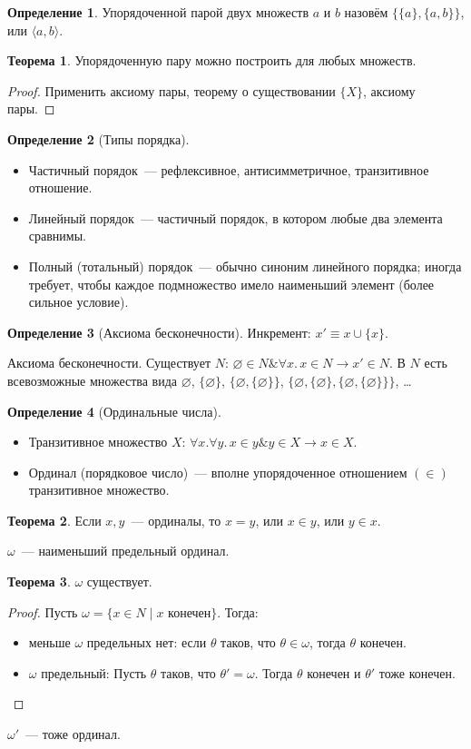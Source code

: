 \documentclass[a4paper,11pt]{article}
\theoremstyle{definition}
\newtheorem*{thm}{Теорема}
\newtheorem*{dfn}{Определение}
\newcommand{\amp}{\mathbin{\&}}
\begin{document}
\begin{dfn}
Упорядоченной парой двух множеств $a$ и $b$ назовём $\{\{a\}, \{a, b\}\}$, или
$\langle a, b\rangle$.
\end{dfn}
\begin{thm}
Упорядоченную пару можно построить для любых множеств.
\end{thm}
\begin{proof}
Применить аксиому пары, теорему о существовании $\{X\}$, аксиому пары.
\end{proof}
\begin{dfn}[Типы порядка]
\begin{itemize}
\item Частичный порядок~--- рефлексивное, антисимметричное, транзитивное
  отношение.
\item Линейный порядок~--- частичный порядок, в котором любые два элемента
  сравнимы.
\item Полный (тотальный) порядок~--- обычно синоним линейного порядка; иногда
  требует, чтобы каждое подмножество имело наименьший элемент (более сильное
  условие).
\end{itemize}
\end{dfn}
\begin{dfn}[Аксиома бесконечности]
Инкремент: $x' \equiv x \cup \{x\}$.

Аксиома бесконечности. Существует $N$: $\varnothing \in N \amp \forall x.\,x \in
N \to x' \in N$. В $N$ есть всевозможные множества вида $\varnothing$,
$\{\varnothing\}$, $\{\varnothing, \{\varnothing\}\}$, $\{\varnothing,
\{\varnothing\}, \{\varnothing, \{\varnothing\}\}\}$, \dots
\end{dfn}
\begin{dfn}[Ординальные числа]
\begin{itemize}
\item Транзитивное множество $X$: $\forall x.\forall y.\,x \in y \amp y \in X
  \to x \in X$.
\item Ординал (порядковое число)~--- вполне упорядоченное отношением $(\in)$
  транзитивное множество.
\end{itemize}
\end{dfn}
\begin{thm}
Если $x, y$~--- ординалы, то $x = y$, или $x \in y$, или $y \in x$.
\end{thm}
$\omega$~--- наименьший предельный ординал.
\begin{thm}
$\omega$ существует.
\end{thm}
\begin{proof}
Пусть $\omega = \{x \in N \mid x \text{ конечен}\}$. Тогда:
\begin{itemize}
\item меньше $\omega$ предельных нет: если $\theta$ таков, что $\theta \in
  \omega$, тогда $\theta$ конечен.
\item $\omega$ предельный: Пусть $\theta$ таков, что $\theta' = \omega$. Тогда
  $\theta$ конечен и $\theta'$ тоже конечен.
\end{itemize}
\end{proof}
$\omega'$~--- тоже ординал.
\end{document}
